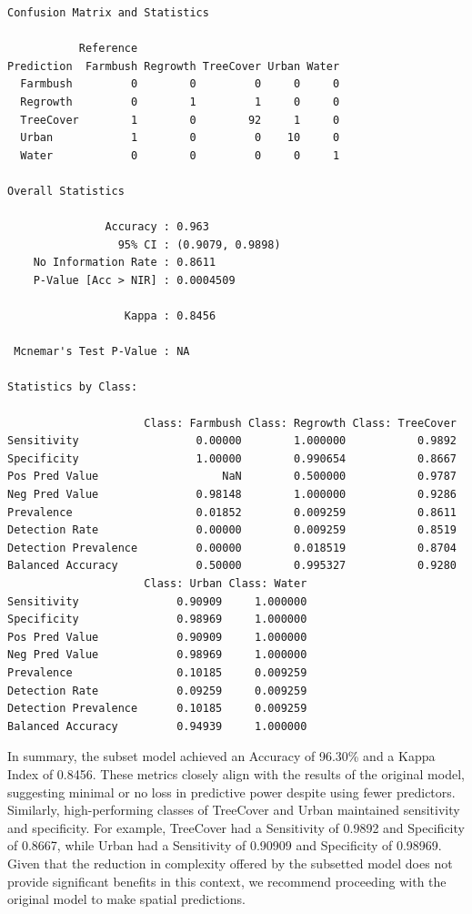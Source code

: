 \documentclass[
]{article}
\begin{document}
\begin{verbatim}
Confusion Matrix and Statistics

           Reference
Prediction  Farmbush Regrowth TreeCover Urban Water
  Farmbush         0        0         0     0     0
  Regrowth         0        1         1     0     0
  TreeCover        1        0        92     1     0
  Urban            1        0         0    10     0
  Water            0        0         0     0     1

Overall Statistics
                                          
               Accuracy : 0.963           
                 95% CI : (0.9079, 0.9898)
    No Information Rate : 0.8611          
    P-Value [Acc > NIR] : 0.0004509       
                                          
                  Kappa : 0.8456          
                                          
 Mcnemar's Test P-Value : NA              

Statistics by Class:

                     Class: Farmbush Class: Regrowth Class: TreeCover
Sensitivity                  0.00000        1.000000           0.9892
Specificity                  1.00000        0.990654           0.8667
Pos Pred Value                   NaN        0.500000           0.9787
Neg Pred Value               0.98148        1.000000           0.9286
Prevalence                   0.01852        0.009259           0.8611
Detection Rate               0.00000        0.009259           0.8519
Detection Prevalence         0.00000        0.018519           0.8704
Balanced Accuracy            0.50000        0.995327           0.9280
                     Class: Urban Class: Water
Sensitivity               0.90909     1.000000
Specificity               0.98969     1.000000
Pos Pred Value            0.90909     1.000000
Neg Pred Value            0.98969     1.000000
Prevalence                0.10185     0.009259
Detection Rate            0.09259     0.009259
Detection Prevalence      0.10185     0.009259
Balanced Accuracy         0.94939     1.000000
\end{verbatim}

In summary, the subset model achieved an Accuracy of 96.30\% and a Kappa
Index of 0.8456. These metrics closely align with the results of the
original model, suggesting minimal or no loss in predictive power
despite using fewer predictors. Similarly, high-performing classes of
TreeCover and Urban maintained sensitivity and specificity. For example,
TreeCover had a Sensitivity of 0.9892 and Specificity of 0.8667, while
Urban had a Sensitivity of 0.90909 and Specificity of 0.98969. Given
that the reduction in complexity offered by the subsetted model does not
provide significant benefits in this context, we recommend proceeding
with the original model to make spatial predictions.
\end{document}
